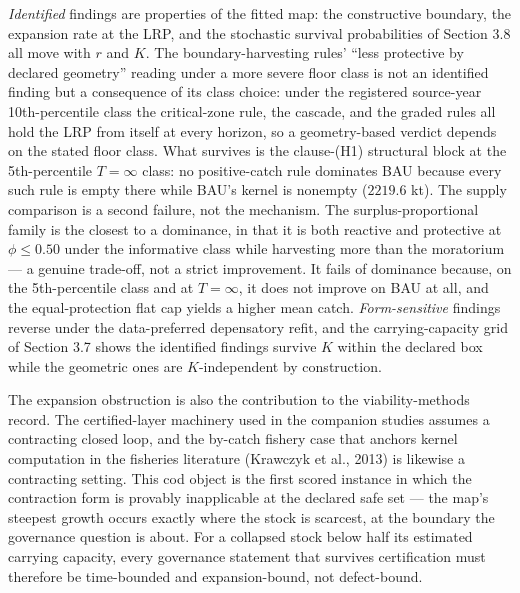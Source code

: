 \documentclass[11pt]{article}
\begin{document}
\emph{Identified} findings are properties of the fitted map: the
constructive boundary, the expansion rate at the LRP, and the stochastic
survival probabilities of Section 3.8 all move with \(r\) and \(K\). The
boundary-harvesting rules' ``less protective by declared geometry''
reading under a more severe floor class is not an identified finding but
a consequence of its class choice: under the registered source-year
10th-percentile class the critical-zone rule, the
cascade, and the graded rules all hold the LRP from itself at every
horizon, so a geometry-based verdict depends on the stated
floor class. What survives is the clause-(H1) structural block at the
5th-percentile \(T=\infty\) class: no positive-catch rule dominates BAU
because every such rule is empty there while BAU's kernel is nonempty
(\(2219.6\) kt). The supply comparison is a second failure, not the
mechanism. The surplus-proportional family is the closest to a
dominance, in that it is both reactive and protective at
\(\phi \le 0.50\) under the informative class while harvesting more than
the moratorium --- a genuine trade-off, not a strict improvement. It
fails of dominance because, on the 5th-percentile class and at
\(T=\infty\), it does not improve on BAU at all, and the
equal-protection flat cap yields a higher mean catch.
\emph{Form-sensitive} findings reverse under the data-preferred
depensatory refit, and the carrying-capacity grid of Section 3.7 shows
the identified findings survive \(K\) within the declared box while the
geometric ones are \(K\)-independent by construction.

The expansion obstruction is also the contribution to the
viability-methods record. The certified-layer machinery used in the
companion studies assumes a contracting closed loop, and the by-catch
fishery case that anchors kernel computation in the fisheries literature
(Krawczyk et al., 2013) is likewise a contracting setting. This cod
object is the first scored instance in which the contraction form is
provably inapplicable at the declared safe set --- the map's steepest
growth occurs exactly where the stock is scarcest, at the boundary the
governance question is about. For a collapsed stock below half its
estimated carrying capacity, every governance statement that survives
certification must therefore be time-bounded and expansion-bound, not
defect-bound.
\end{document}
